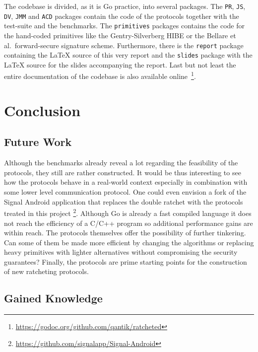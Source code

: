 \documentclass[11pt,a4paper,twoside,openright,bibliography=totoc]{scrbook}
\begin{document}
The codebase is divided, as it is Go practice, into several
packages. The \texttt{PR}, \texttt{JS}, \texttt{DV},
\texttt{JMM} and \texttt{ACD} packages contain
the code of the protocols together with the test-suite
and the benchmarks. The \texttt{primitives} packages
contains the code for the hand-coded primitives
like the Gentry-Silverberg HIBE or the Bellare
et al.~forward-secure signature scheme. Furthermore,
there is the \texttt{report} package containing
the \LaTeX{} source of this very report and the
\texttt{slides} package with the \LaTeX{} source
for the slides accompanying the report. Last but
not least the entire documentation of the
codebase is also available
online~\footnote{\url{https://godoc.org/github.com/qantik/ratcheted}}.

\chapter{Conclusion}
\label{chap:conclusion}

\section{Future Work}
\label{sec:future-work}

Although the benchmarks already reveal a lot regarding the feasibility
of the protocols, they still are rather constructed. It would be thus
interesting to see how the protocols behave in a real-world context
especially in combination with some lower level communication
protocol. One could even envision a fork of the Signal Android
application that replaces the double ratchet with the protocols
treated in this project \footnote{\url{https://github.com/signalapp/Signal-Android}}.
Although Go is already a fast compiled language it does
not reach the efficiency of a C/C++ program so additional performance
gains are within reach. The protocols themselves offer
the possibility of further tinkering. Can some of them be made
more efficient by changing the algorithms or replacing
heavy primitives with lighter alternatives without compromising
the security guarantees? Finally, the protocols are prime starting
points for the construction of new ratcheting protocols.

\section{Gained Knowledge}
\label{sec:gained-knowledge}
\end{document}
